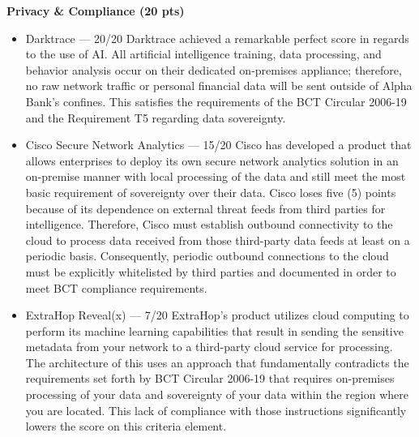 \documentclass[12pt,a4paper]{report}
\begin{document}
\noindent \textbf{Privacy \& Compliance (20 pts)}
\begin{itemize}
    \item Darktrace — 20/20 Darktrace achieved a remarkable perfect score in regards to the use of AI. All artificial intelligence training, data processing, and behavior analysis occur on their dedicated on-premises appliance; therefore, no raw network traffic or personal financial data will be sent outside of Alpha Bank's confines. This satisfies the requirements of the BCT Circular 2006-19 and the Requirement T5 regarding data sovereignty.

    \item Cisco Secure Network Analytics — 15/20 Cisco has developed a product that allows enterprises to deploy its own secure network analytics solution in an on-premise manner with local processing of the data and still meet the most basic requirement of sovereignty over their data. Cisco loses five (5) points because of its dependence on external threat feeds from third parties for intelligence. Therefore, Cisco must establish outbound connectivity to the cloud to process data received from those third-party data feeds at least on a periodic basis. Consequently, periodic outbound connections to the cloud must be explicitly whitelisted by third parties and documented in order to meet BCT compliance requirements.

    \item ExtraHop Reveal(x) — 7/20 ExtraHop's product utilizes cloud computing to perform its machine learning capabilities that result in sending the sensitive metadata from your network to a third-party cloud service for processing. The architecture of this uses an approach that fundamentally contradicts the requirements set forth by BCT Circular 2006-19 that requires on-premises processing of your data and sovereignty of your data within the region where you are located. This lack of compliance with those instructions significantly lowers the score on this criteria element.
\end{itemize}
\end{document}
